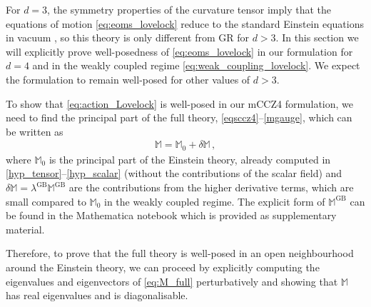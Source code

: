 \documentclass[reprint,aps,amsmath,amssymb,twoside,prd,showkeys,superscriptaddress,nofootinbib]{revtex4-2}
\begin{document}
For $d=3$,  the symmetry properties of the curvature tensor imply that the equations of motion \eqref{eq:eoms_lovelock} reduce to the standard Einstein equations in vacuum \cite{Kovacs:2020ywu}, so this theory is only different from GR for $d>3$. In this section we will 
explicitly prove well-posedness of \eqref{eq:eoms_lovelock} in our formulation for $d=4$ and in the weakly coupled regime \eqref{eq:weak_coupling_lovelock}. We expect the formulation to remain well-posed for other values of $d>3$.


To show that \eqref{eq:action_Lovelock} is well-posed in our mCCZ4 formulation, we need to find the principal part of the full theory, \eqref{eqsccz4}--\eqref{mgauge}, which can be written as
\begin{align}
    \mathbb{M}=\mathbb{M}_0+\delta\mathbb{M}\,,
    \label{eq:M_full}
\end{align}
where ${\mathbb M}_0$ is the principal part of the Einstein theory, already computed in \eqref{hyp_tensor}--\eqref{hyp_scalar} (without the contributions of the scalar field) and $\delta\mathbb{M}=\lambda^{\text{GB}}\mathbb{M}^{\text{GB}}$ are the contributions from the higher derivative terms, which are small compared to $\mathbb M_0$ in the weakly coupled regime. The explicit form of ${\mathbb M}^{\text{GB}}$ can be found in the Mathematica notebook \cite{supp} which is provided as supplementary material.

Therefore, to prove that the full theory is well-posed in an open neighbourhood around the Einstein theory, we can proceed by explicitly computing the eigenvalues and eigenvectors of \eqref{eq:M_full} perturbatively and showing that $\mathbb M$ has real eigenvalues and is diagonalisable.
\end{document}
